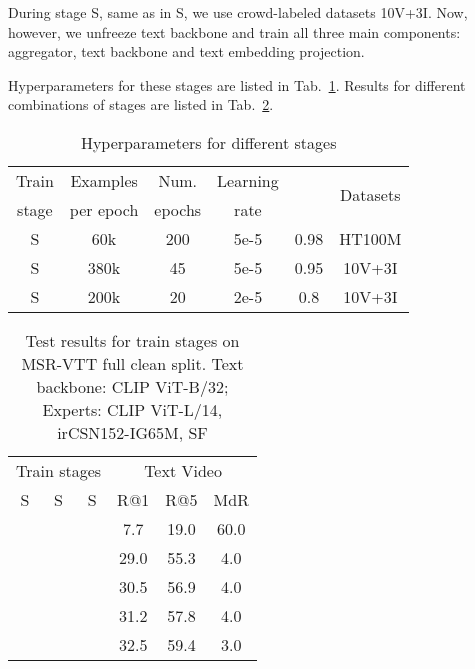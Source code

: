 During stage S, same as in S, we use  crowd-labeled datasets 10V+3I. Now, however, we unfreeze text backbone and train all three main components: aggregator, text backbone and text embedding projection.

Hyperparameters for these stages are listed in Tab.~\ref{tab:stages_params}.
Results for different combinations of stages are listed in Tab.~\ref{tab:stages_results}.

\begin{table}
	\centering
	\caption{Hyperparameters for different stages}
	\label{tab:stages_params}
	
	\begin{tabular}{|c|*{4}c|c|}
		\toprule
		Train & Examples & Num. & Learning& \multirow{2}{*}{} & \multirow{2}{*}{Datasets}  \\
		stage&per epoch & epochs & rate && \\
		\midrule
		S & 60k & 200 & 5e-5 & 0.98 & HT100M \\
		S & 380k & 45 & 5e-5 & 0.95 & 10V+3I \\
		S & 200k & 20 & 2e-5 & 0.8  & 10V+3I  \\
		\bottomrule
	\end{tabular}	
\end{table}

\begin{table}
	\centering
	\caption{ Test results for train stages on MSR-VTT full clean split.
  Text backbone: CLIP ViT-B/32; Experts: CLIP ViT-L/14, irCSN152-IG65M, SF}
	\label{tab:stages_results}
	
	\begin{tabular}{|*{3}c|*3{c}|}
		\toprule
		\multicolumn{3}{|c|}{Train stages} & \multicolumn{3}{c|}{Text  Video} \\ 
		S & S & S & R@1 & R@5 & MdR \\
		\midrule
		\checkmark &  &                       
		& 7.7  & 19.0 & 60.0 \\
	    & \checkmark &                   
		& 29.0 & 55.3 & 4.0  \\
		& \checkmark &  \checkmark        
		& 30.5 & 56.9 & 4.0  \\
		\checkmark  & \checkmark   &                        
		& 31.2  & 57.8 & 4.0 \\
		\checkmark    & \checkmark &  \checkmark        
		& 32.5 & 59.4 & 3.0  \\
		\bottomrule
	\end{tabular}	
\end{table}

